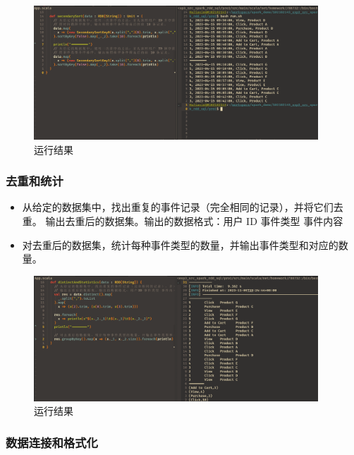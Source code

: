 \documentclass{article}
\begin{document}
\begin{figure}[H]
  \begin{center}
    \includegraphics[width=0.95\textwidth]{./figures/1-1.png}
  \end{center}
  \caption{运行结果}
\end{figure}


\subsubsection{去重和统计}
\begin{itemize}
  \item 从给定的数据集中，找出重复的事件记录（完全相同的记录），并将它们去重。
    输出去重后的数据集。输出的数据格式：用户 ID 事件类型 事件内容
  \item 对去重后的数据集，统计每种事件类型的数量，并输出事件类型和对应的数量。
\end{itemize}

\begin{figure}[H]
  \begin{center}
    \includegraphics[width=0.95\textwidth]{./figures/1-2.png}
  \end{center}
  \caption{运行结果}
\end{figure}

\subsubsection{数据连接和格式化}
\end{document}
